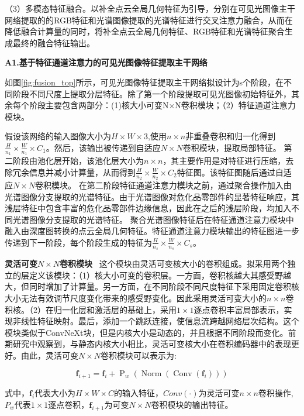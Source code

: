\documentclass[12pt]{article}
\begin{document}
（3）多模态特征融合。以补全点云全局几何特征为引导，分别在可见光图像主干网络提取的的RGB特征和光谱图像提取的光谱特征进行交叉注意力融合，从而在降低融合计算量的同时，将补全点云全局几何特征、RGB特征和光谱特征聚合生成最终的融合特征输出。

\textbf{A1.基于特征通道注意力的可见光图像特征提取主干网络}

如图\ref{fig:fusion_top}所示，可见光图像特征提取主干网络拟设计为s个阶段，在不同阶段不同尺度上提取分层特征。除了第一个阶段提取可见光图像初始特征外，其余每个阶段主要包含两部分：(1)核大小可变N×N卷积模块；（2）特征通道注意力模块。

假设该网络的输入图像大小为$H \times W \times 3$,使用$n \times n $非重叠卷积和归一化得到$\frac{H}{n_1} \times \frac{W}{n_1} \times C_1$。然后，该输出被传递到自适应$N \times N $卷积模块，提取局部特征。
第二阶段由池化层开始，该池化层大小为$n \times n $，其主要作用是对特征进行压缩，去除冗余信息并减小计算量，从而得到$\frac{H}{n_2} \times \frac{W}{n_2} \times C_2$特征图。该特征图随后通过自适应$N \times N $卷积模块。
在第二阶段特征通道注意力模块之前，通过聚合操作加入由光谱图像分支提取的光谱特征。由于光谱图像对危化品零部件的显著特征响应，其浅层特征中包含丰富的危化品零部件边缘信息，因此在之后的浅层阶段，均加入不同光谱图像分支提取的光谱特征。
聚合光谱图像特征后在特征通道注意力模块中融入由深度图转换的点云全局几何特征。特征通道注意力模块输出的特征图进一步传递到下一阶段，每个阶段生成的特征为$\frac{H}{n_s} \times \frac{W}{n_s} \times C_s$。

\textbf{灵活可变$N \times N $卷积模块} \ 这个模块由灵活可变核大小的卷积组成。拟采用两个独立的层定义该模块：（1）核大小可变的卷积层。一方面，卷积核越大其感受野越大，但同时增加了计算量。另一方面，在不同阶段不同尺度特征下采用固定卷积核大小无法有效调节尺度变化带来的感受野变化。因此采用灵活可变大小的$n \times n$卷积核。（2）在归一化层和激活层的基础上，采用$1 \times 1$逐点卷积丰富局部表示，实现非线性特征映射。最后，添加一个跳跃连接，使信息流跨越网络层次结构。这个模块类似于ConvNeXt块，但是内核大小是动态的，并且根据不同阶段而变化。前期研究中观察到，与静态内核大小相比，灵活可变核大小在卷积编码器中的表现更好。由此，灵活可变$N \times N $卷积模块可以表示为:

\begin{equation}  \boldsymbol{f}_{i+1}=\boldsymbol{f}_{i}+\operatorname{P}_{w}\left(
\operatorname{Norm}\left(\operatorname{Conv}\left(\boldsymbol{f}_{i}\right)\right)
\right)
\end{equation}

式中，$\boldsymbol{f}_{i}$代表大小为$H \times W \times C$的输入特征，$Conv(\cdot)$为灵活可变$n \times n $卷积操作,$P_w$代表$1 \times 1$逐点卷积，$\boldsymbol{f}_{i+1}$为可变$N \times N $卷积模块的输出特征。
\end{document}
